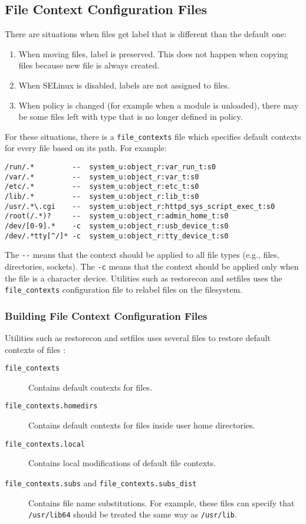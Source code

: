 \subsection{File Context Configuration Files}
There are situations when files get label that is different than the default
one:
\begin{enumerate}
    \item When moving files, label is preserved. This does not happen when
        copying files because new file is always created.
    \item When SELinux is disabled, labels are not assigned to files.
    \item When policy is changed (for example when a module is unloaded), there
        may be some files left with type that is no longer defined in policy.
\end{enumerate}
For these situations, there is a \texttt{file\_contexts} file which specifies
default contexts for every file based on its path. For example:
\begin{lstlisting}
/run/.*         --  system_u:object_r:var_run_t:s0
/var/.*	        --  system_u:object_r:var_t:s0
/etc/.*	        --  system_u:object_r:etc_t:s0
/lib/.*	        --  system_u:object_r:lib_t:s0
/usr/.*\.cgi    --  system_u:object_r:httpd_sys_script_exec_t:s0
/root(/.*)?     --  system_u:object_r:admin_home_t:s0
/dev/[0-9].*    -c  system_u:object_r:usb_device_t:s0
/dev/.*tty[^/]* -c  system_u:object_r:tty_device_t:s0
\end{lstlisting}
The \texttt{-{}-} means that the context should be applied to all file types
(e.g., files, directories, sockets). The \texttt{-c} means that the context
should be applied only when the file is a character device. Utilities such as
restorecon and setfiles uses the \texttt{file\_contexts} configuration file to
relabel files on the filesystem.

\subsubsection{Building File Context Configuration Files}
Utilities such as restorecon and setfiles uses several files to
restore default contexts of files \cite[pp.~165--167]{tsn}:
\begin{description}
    \item [\texttt{file\_contexts}] Contains default contexts for files.
    \item [\texttt{file\_contexts.homedirs}] Contains default contexts for files
        inside user home directories.
    \item [\texttt{file\_contexts.local}] Contains local modifications of
        default file contexts.
    \item [\texttt{file\_contexts.subs} and \texttt{file\_contexts.subs\_dist}]
        Contains file name substitutions. For example, these files can specify
        that \texttt{/usr/lib64} should be treated the same way as
        \texttt{/usr/lib}.
\end{description}

